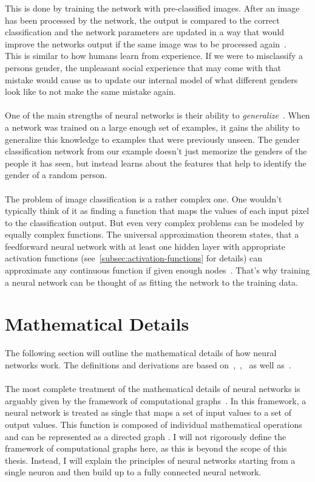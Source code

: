 This is done by training the network with pre-classified images.
After an image has been processed by the network, the output is compared to the correct classification and the network parameters are updated in a way that would improve the networks output if the same image was to be processed again~\cite[chapter 1.2]{aggarwal_neural_2018,ibm_nn}.
\\
This is similar to how humans learn from experience.
If we were to misclassify a persons gender, the unpleasant social experience that may come with that mistake would cause us to update our internal model of what different genders look like to not make the same mistake again.
\\
\\
One of the main strengths of neural networks is their ability to \textit{generalize}~\cite{gonfalonieri_understand_2020}.
When a network was trained on a large enough set of examples, it gains the ability to generalize this knowledge to examples that were previously unseen.
The gender classification network from our example doesn't just memorize the genders of the people it has seen, but instead learns about the features that help to identify the gender of a random person.
\\
\\
The problem of image classification is a rather complex one.
One wouldn't typically think of it as finding a function that maps the values of each input pixel to the classification output.
But even very complex problems can be modeled by equally complex functions.
The universal approximation theorem states, that a feedforward neural network with at least one hidden layer with appropriate activation functions (see~\ref{subsec:activation-functions} for details) can approximate any continuous function if given enough nodes~\cite[chapter 6.4.1]{goodfellow_deep_2016}.
That's why training a neural network can be thought of as fitting the network to the training data.
\\
\section{Mathematical Details}
\label{sec:nn-mathematical-details}
The following section will outline the mathematical details of how neural networks work.
The definitions and derivations are based on~\cite[chapter 1.2-1.3]{aggarwal_neural_2018},~\cite[chapter 5-6]{goodfellow_deep_2016},~\cite{ibm_nn} as well as~\cite[chapter 4.4]{haykin_neural_1998}.
\\
\\
The most complete treatment of the mathematical details of neural networks is arguably given by the framework of computational graphs~\cite{bettilyon_computationalgraphs_2020}.
In this framework, a neural network is treated as single that maps a set of input values to a set of output values.
This function is composed of individual mathematical operations and can be represented as a directed graph \cite[section 1.4]{haykin_neural_1998}.
I will not rigorously define the framework of computational graphs here, as this is beyond the scope of this thesis.
Instead, I will explain the principles of neural networks starting from a single neuron and then build up to a fully connected neural network.
